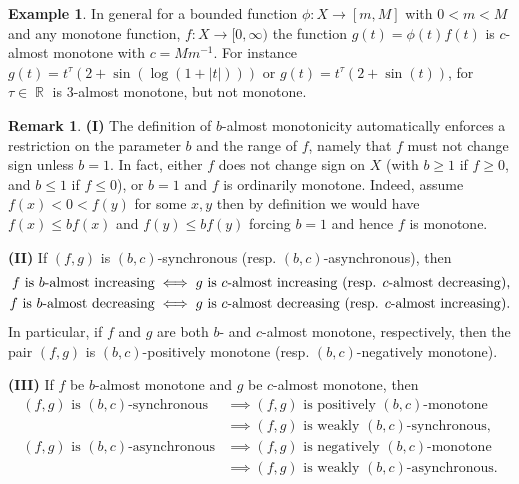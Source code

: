 \documentclass[12pt, reqno]{amsart}%
\theoremstyle{plain}  %
\theoremstyle{definition}  %
\newtheorem{example}[theorem]{Example}
\newtheorem{remark}[theorem]{Remark}   %
\theoremstyle{remark}
\numberwithin{equation}{section}
\DeclareMathOperator{\R}{\mathbb{R}}
\begin{document}
\begin{example}
In general for a bounded  function $ \phi:X\to [m, M]$ with $0<m<M$ and any monotone function, $f:X\to [0, \infty)$ the function $g(t)= \phi(t) f(t)$ is $c$-almost monotone with $c=Mm^{-1}$. For instance $g(t) = t^\tau(2+ \sin(\log (1+|t|)))$ or  $g(t) = t^\tau(2 + \sin(t))$, for $\tau \in \R$
is $3$-almost monotone, but not monotone.
\end{example}

\begin{remark}
\textbf{(I)} The definition of $b$-almost monotonicity automatically enforces a restriction on the parameter $b$ and the range of $f$, namely that $f$ must not change sign unless $b=1$. In fact, either $f$ does not change sign on $X$ \textup{(}with $b \geq 1$ if $f \geq 0$, and $b \leq 1$ if $f \leq 0$\textup{)}, or $b = 1$ and $f$ is ordinarily monotone. Indeed,  assume $f(x)<0<f(y)$ for some $x,y$ then by definition we would have
$f(x) \leq b f(x)$ and $f(y) \leq b f(y)$ forcing  $b=1$ and hence $f$ is monotone.
\smallskip 

\textbf{(II)} If $(f,g)$ is $(b,c)$-synchronous \textup{(}resp. $(b,c)$-asynchronous\textup{)}, then
\begin{align*}
f \text{ is $b$-almost increasing} &\iff g \text{ is $c$-almost increasing \textup{(}resp. $c$-almost decreasing\textup{)},} \\
f \text{ is $b$-almost decreasing} &\iff g \text{ is $c$-almost decreasing \textup{(}resp. $c$-almost increasing\textup{)}.}
\end{align*}
In particular, if $f$ and $g$ are both $b$- and $c$-almost monotone, respectively, then the pair $(f,g)$ is $(b,c)$-positively monotone \textup{(}resp. $(b,c)$-negatively monotone\textup{)}.
\medskip 

\textbf{(III)} If  $f$ be $b$-almost monotone and $g$ be $c$-almost monotone, then 
\begin{align*}
(f,g) \text{ is $(b,c)$-synchronous} 
&\implies (f,g) \text{ is positively  $(b,c)$-monotone}\\ 
&\implies (f,g) \text{ is weakly $(b,c)$-synchronous}, \\ 
(f,g) \text{ is $(b,c)$-asynchronous}  
&\implies (f,g) \text{ is negatively $(b,c)$-monotone} 
\\
&\implies (f,g) \text{ is weakly $(b,c)$-asynchronous}. 
\end{align*}
\end{remark}
\end{document}
